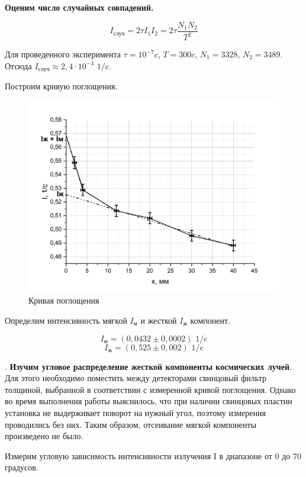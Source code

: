 \documentclass[a4paper,12pt]{article} %
\begin{document}
\noindent \textbf{Оценим число случайных совпадений.} 

$$I_{\text{случ}} = 2\tau I_1 I_2 = 2\tau \frac{N_1N_2}{T^2}$$


\noindent Для проведенного эксперимента $\tau = 10^{-7} c$, $T = 300 c$, $N_1 = 3328$, $N_2 = 3489$. Отсюда $I_{\text{случ}} \approx 2,4 \cdot 10^{-4} \text{ 1/c}$.

\medskip

\noindent Построим кривую поглощения.

\begin{figure}[h!]
    \centering
    \includegraphics[scale=0.5]{1.png}
    \caption{Кривая поглощения}
    
\end{figure} 

\noindent Определим интенсивность мягкой $I_{\text{м}}$ и жесткой $I_{\text{ж}}$ компонент.

$$I_{\text{м}} = (0,0432 \pm 0,0002) \text{ 1/c}$$
$$I_{\text{ж}} = (0,525 \pm 0,002) \text{ 1/c}$$

. \textbf{Изучим угловое распределение жесткой компоненты космических лучей}. Для этого необходимо поместить между детекторами свинцовый фильтр толщиной, выбранной в соответствии с измеренной кривой поглощения. Однако во время выполнения работы выяснилось, что при наличии свинцовых пластин установка не выдерживает поворот на нужный угол, поэтому измерения проводились без них. Таким образом, отсеивание мягкой компоненты произведено не было.

\medskip

\noindent Измерим угловую зависимость интенсивности излучения I в диапазоне от 0 до 70 градусов.
\end{document}
